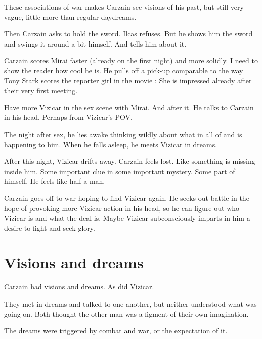 These associations of war makes Carzain see visions of his past, but still very vague, little more than regular daydreams. 

Then Carzain asks to hold the sword. 
Ilcas refuses. 
But he shows him the sword and swings it around a bit himself. 
And tells him about it. 

Carzain scores Mirai faster (already on the first night) and more solidly. 
I need to show the reader how cool he is. 
He pulls off a pick-up comparable to the way Tony Stark scores the reporter girl in the movie \cite{Movie:IronMan}: 
She is impressed already after their very first meeting. 

Have more Vizicar in the sex scene with Mirai. 
And after it. 
He talks to Carzain in his head. 
Perhaps from Vizicar's POV. 

The night after sex, he lies awake thinking wildly about what in all of \Iquin and \Itzach is happening to him. 
When he falls asleep, he meets Vizicar in dreams. 

After this night, Vizicar drifts away. 
Carzain feels lost. 
Like something is missing inside him. 
Some important clue in some important mystery. 
Some part of himself. 
He feels like half a man. 

Carzain goes off to war hoping to find Vizicar again.  
He seeks out battle in the hope of provoking more Vizicar action in his head, so he can figure out who Vizicar is and what the deal is. 
Maybe Vizicar subconsciously imparts in him a desire to fight and seek glory. 
















\section{Visions and dreams}
Carzain had visions and dreams. 
As did Vizicar. 

They met in dreams and talked to one another, but neither understood what was going on. 
Both thought the other man was a figment of their own imagination. 

The dreams were triggered by combat and war, or the expectation of it. 









